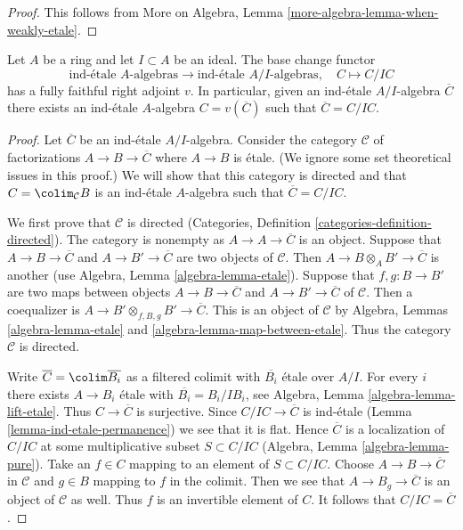 \begin{proof}
This follows from More on Algebra, Lemma
\ref{more-algebra-lemma-when-weakly-etale}.
\end{proof}

\begin{lemma}
\label{lemma-lift-ind-etale}
Let $A$ be a ring and let $I \subset A$ be an ideal. The base change functor
$$
\text{ind-\'etale }A\text{-algebras}
\longrightarrow
\text{ind-\'etale }A/I\text{-algebras},\quad
C \longmapsto C/IC
$$
has a fully faithful right adjoint $v$. In particular, given
an ind-\'etale $A/I$-algebra $\overline{C}$ there exists
an ind-\'etale $A$-algebra $C = v(\overline{C})$ such that
$\overline{C} = C/IC$.
\end{lemma}

\begin{proof}
Let $\overline{C}$ be an ind-\'etale $A/I$-algebra.
Consider the category $\mathcal{C}$ of factorizations
$A \to B \to \overline{C}$ where $A \to B$ is \'etale.
(We ignore some set theoretical issues in this proof.)
We will show that this category is directed and that
$C = \colim_\mathcal{C} B$ is an ind-\'etale $A$-algebra
such that $\overline{C} = C/IC$.

\medskip\noindent
We first prove that $\mathcal{C}$ is directed
(Categories, Definition \ref{categories-definition-directed}).
The category is nonempty as $A \to A \to \overline{C}$ is an object.
Suppose that $A \to B \to \overline{C}$ and $A \to B' \to \overline{C}$
are two objects of $\mathcal{C}$. Then $A \to B \otimes_A B' \to \overline{C}$
is another (use Algebra, Lemma \ref{algebra-lemma-etale}).
Suppose that $f, g : B \to B'$ are two maps between
objects $A \to B \to \overline{C}$ and $A \to B' \to \overline{C}$
of $\mathcal{C}$. Then a coequalizer is
$A \to B' \otimes_{f, B, g} B' \to \overline{C}$.
This is an object of $\mathcal{C}$ by
Algebra, Lemmas \ref{algebra-lemma-etale} and
\ref{algebra-lemma-map-between-etale}.
Thus the category $\mathcal{C}$ is directed.

\medskip\noindent
Write $\overline{C} = \colim \overline{B_i}$ as a filtered colimit with
$\overline{B_i}$ \'etale over $A/I$. For every $i$
there exists $A \to B_i$ \'etale with $\overline{B_i} = B_i/IB_i$, see
Algebra, Lemma \ref{algebra-lemma-lift-etale}.
Thus $C \to \overline{C}$ is surjective.
Since $C/IC \to \overline{C}$ is ind-\'etale
(Lemma \ref{lemma-ind-etale-permanence})
we see that it is flat. Hence $\overline{C}$ is a localization of
$C/IC$ at some multiplicative subset $S \subset C/IC$
(Algebra, Lemma \ref{algebra-lemma-pure}).
Take an $f \in C$ mapping to an element of $S \subset C/IC$.
Choose $A \to B \to \overline{C}$ in $\mathcal{C}$ and $g \in B$
mapping to $f$ in the colimit. Then we see that $A \to B_g \to \overline{C}$
is an object of $\mathcal{C}$ as well. Thus $f$ is an invertible
element of $C$. It follows that $C/IC = \overline{C}$.


\end{proof}
